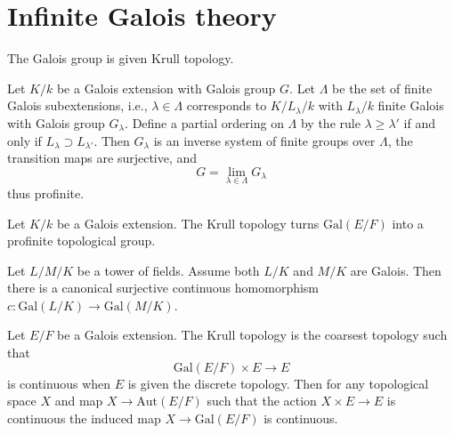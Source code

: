 \chapter{Infinite Galois theory}
\label{section-infinite-galois}

\noindent
The Galois group is given Krull topology.



\begin{lemma}\cite[\href{https://stacks.math.columbia.edu/tag/0BU2}{Lemma 0BU2}]{stacks-project}
	\label{lemma-infinite-galois-eq-limit}
	\leanok
	Let $K/k$ be a Galois extension with Galois group $G$.
	Let $\Lambda$ be the set of finite Galois subextensions,
	i.e., $\lambda \in \Lambda$ corresponds to $K/L_\lambda/k$
	with $L_\lambda/k$ finite Galois with Galois group $G_\lambda$.
	Define a partial ordering on $\Lambda$ by the rule
	$\lambda \geq \lambda'$ if and only if
	$L_\lambda \supset L_{\lambda'}$. Then
	$G_\lambda$ is an inverse system of finite groups over $\Lambda$,
	the transition maps are surjective, and
	$$
	G = \lim_{\lambda \in \Lambda} G_\lambda
	$$
	thus profinite.
\end{lemma}

\begin{lemma}\cite[\href{https://stacks.math.columbia.edu/tag/0BMJ}{Lemma 0BMJ}]{stacks-project}
	\label{lemma-infinite-galois-profinite}
	\leanok
	Let $K/k$ be a Galois extension. The Krull topology turns $\text{Gal}(E/F)$ into a profinite topological group.
\end{lemma}

\begin{lemma}\cite[\href{https://stacks.math.columbia.edu/tag/0BMK}{Lemma 0BMK}]{stacks-project}
	\label{lemma-infinite-galois-restrict-continuous}
	\leanok
	Let $L/M/K$ be a tower of fields. Assume both $L/K$ and
	$M/K$ are Galois. Then there is a canonical surjective continuous
	homomorphism $c : \text{Gal}(L/K) \to \text{Gal}(M/K)$.
\end{lemma}

\begin{lemma}\cite[\href{https://stacks.math.columbia.edu/tag/0BMJ}{Lemma 0BMJ}]{stacks-project}
	\label{lemma-infinite-galois-krull-topology}
	Let $E/F$ be a Galois extension. The Krull topology is the coarsest
	topology such that
	$$
	\text{Gal}(E/F) \times E \longrightarrow E
	$$
	is continuous when $E$ is given the discrete topology. Then
	for any topological space $X$ and map $X \to \text{Aut}(E/F)$
	such that the action $X \times E \to E$ is continuous the induced map
	$X \to \text{Gal}(E/F)$ is continuous.
	
\end{lemma}

